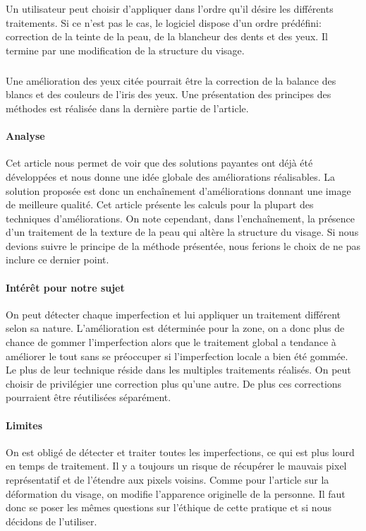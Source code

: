 \documentclass[11pt, french,screen]{report-rd-info}
\begin{document}
Un utilisateur peut choisir d’appliquer dans l’ordre qu’il désire les différents traitements. Si ce n’est pas le cas, le logiciel dispose d’un ordre prédéfini: correction de la teinte de la peau, de la blancheur des dents et des yeux. Il termine par une modification de la structure du visage.
\subparagraph{}
Une amélioration des yeux citée pourrait être la correction de la balance des blancs et des couleurs de l’iris des yeux. Une présentation des principes des méthodes est réalisée dans la dernière partie de l’article.
\paragraph{Analyse}
Cet article nous permet de voir que des solutions payantes ont déjà été développées et nous donne une idée globale des améliorations réalisables. La solution proposée est donc un enchaînement d’améliorations donnant une image de meilleure qualité. Cet article présente les calculs pour la plupart des techniques d’améliorations. On note cependant, dans l'enchaînement, la présence d’un traitement de la texture de la peau qui altère la structure du visage. Si nous devions suivre le principe de la méthode présentée, nous ferions le choix de ne pas inclure ce dernier point.
\paragraph{Intérêt pour notre sujet}
On peut détecter chaque imperfection et lui appliquer un traitement différent selon sa nature. L’amélioration est déterminée pour la zone, on a donc plus de chance de gommer l’imperfection alors que le traitement global a tendance à améliorer le tout sans se préoccuper si l’imperfection locale a bien été gommée. Le plus de leur technique réside dans les multiples traitements réalisés. On peut choisir de privilégier une correction plus qu’une autre. De plus ces corrections pourraient être réutilisées séparément.
\paragraph{Limites}
On est obligé de détecter et traiter toutes les imperfections, ce qui est plus lourd en temps de traitement.
Il y a toujours un risque de récupérer le mauvais pixel représentatif et de l’étendre aux pixels voisins.
Comme pour l’article sur la déformation du visage, on modifie l’apparence originelle de la personne. Il faut donc se poser les mêmes questions sur l’éthique de cette pratique et si nous décidons de l’utiliser.
\end{document}
